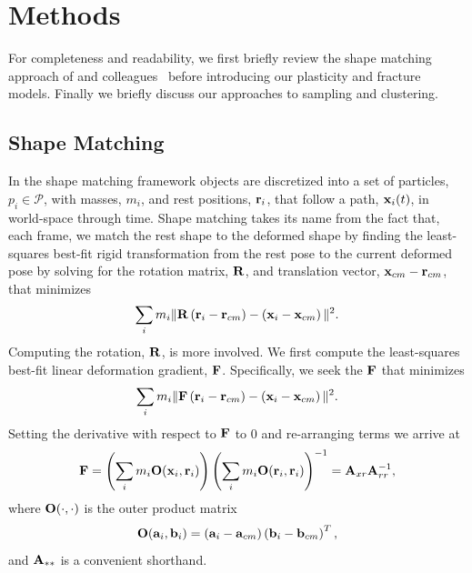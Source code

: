 \documentclass[conference]{acmsiggraph}
\begin{document}
\section{Methods}
For completeness and readability, we first briefly review the shape matching approach of \Mueller and colleagues~ before
introducing our plasticity and fracture models.  Finally we briefly discuss our approaches to sampling and clustering.
\subsection{Shape Matching}
\label{sec:ShapeMatching}
In the shape matching framework
objects are discretized into a set of particles, $p_i\in\mathcal{P}$, with masses, $m_i$, and rest positions, $\mathit{\mathbf{r}}_i$, 
that follow a path, $\mathit{\mathbf{x}}_i(t)$, in world-space through time.  
Shape matching takes its name from the fact that, each frame, we match the rest shape to 
the deformed shape by finding
the least-squares best-fit rigid transformation from the rest pose
to the current deformed pose by
solving for the rotation matrix, $\mathit{\mathbf{R}}$, and translation
vector, $\mathit{\mathbf{x}}_{cm}-\mathit{\mathbf{r}}_{cm}$, that minimizes
\begin{equation}
\label{eq:sm}
\sum_i m_i \| \mathit{\mathbf{R}}\left(\mathit{\mathbf{r}}_i - \mathit{\mathbf{r}}_{cm}\right)-\left(\mathit{\mathbf{x}}_i-\mathit{\mathbf{x}}_{cm}\right)\|^2.
\end{equation}
Computing the rotation, $\mathit{\mathbf{R}}$, is more involved.  
We first compute the least-squares best-fit linear deformation gradient, $\mathit{\mathbf{F}}$.
Specifically, we seek the $\mathit{\mathbf{F}}$ that minimizes
\begin{equation}
\sum_i m_i \| \mathit{\mathbf{F}}\left(\mathit{\mathbf{r}}_i - \mathit{\mathbf{r}}_{cm}\right)-\left(\mathit{\mathbf{x}}_i-\mathit{\mathbf{x}}_{cm}\right)\|^2.
\end{equation}
Setting the derivative with respect to $\mathit{\mathbf{F}}$ to $0$ and re-arranging terms we arrive at
\begin{equation}
\label{eq:defgrad}
\mathit{\mathbf{F}} = \left(\sum_i m_i \mathit{\mathbf{O}}(\mathit{\mathbf{x}}_i,\mathit{\mathbf{r}}_i)\right)\left(\sum_im_i\mathit{\mathbf{O}}(\mathit{\mathbf{r}}_i,\mathit{\mathbf{r}}_i)\right)^{-1} = \mathit{\mathbf{A}}_{xr}\mathit{\mathbf{A}}_{rr}^{-1},
\end{equation}
where $\mathit{\mathbf{O}}(\cdot,\cdot)$ is the outer product matrix
\begin{equation}
\mathit{\mathbf{O}}(\mathit{\mathbf{a}}_i,\mathit{\mathbf{b}}_i) = \left(\mathit{\mathbf{a}}_i-\mathit{\mathbf{a}}_{cm}\right)\left(\mathit{\mathbf{b}}_{i}-\mathit{\mathbf{b}}_{cm}\right)^T,
\end{equation}
and $\mathit{\mathbf{A}}_{**}$ is a convenient shorthand.
\end{document}
